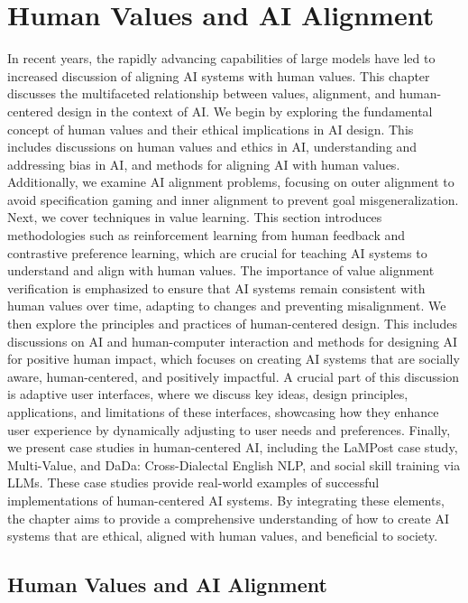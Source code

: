 \documentclass[
  letterpaper,
  numbers=noenddot,
  DIV=11]{scrreprt}
\let\oldchapter\chapter
\def\chapter{%
  \setcounter{sidenote}{1}%
  \oldchapter
}
\theoremstyle{definition}
\theoremstyle{plain}
\theoremstyle{plain}
\theoremstyle{remark}
\begin{document}

\chapter{Human Values and AI Alignment}\label{sec-human-ai-alginment}

In recent years, the rapidly advancing capabilities of large models have
led to increased discussion of aligning AI systems with human values.
This chapter discusses the multifaceted relationship between values,
alignment, and human-centered design in the context of AI. We begin by
exploring the fundamental concept of human values and their ethical
implications in AI design. This includes discussions on human values and
ethics in AI, understanding and addressing bias in AI, and methods for
aligning AI with human values. Additionally, we examine AI alignment
problems, focusing on outer alignment to avoid specification gaming and
inner alignment to prevent goal misgeneralization. Next, we cover
techniques in value learning. This section introduces methodologies such
as reinforcement learning from human feedback and contrastive preference
learning, which are crucial for teaching AI systems to understand and
align with human values. The importance of value alignment verification
is emphasized to ensure that AI systems remain consistent with human
values over time, adapting to changes and preventing misalignment. We
then explore the principles and practices of human-centered design. This
includes discussions on AI and human-computer interaction and methods
for designing AI for positive human impact, which focuses on creating AI
systems that are socially aware, human-centered, and positively
impactful. A crucial part of this discussion is adaptive user
interfaces, where we discuss key ideas, design principles, applications,
and limitations of these interfaces, showcasing how they enhance user
experience by dynamically adjusting to user needs and preferences.
Finally, we present case studies in human-centered AI, including the
LaMPost case study, Multi-Value, and DaDa: Cross-Dialectal English NLP,
and social skill training via LLMs. These case studies provide
real-world examples of successful implementations of human-centered AI
systems. By integrating these elements, the chapter aims to provide a
comprehensive understanding of how to create AI systems that are
ethical, aligned with human values, and beneficial to society.

\section{Human Values and AI
Alignment}\label{human-values-and-ai-alignment}
\end{document}
